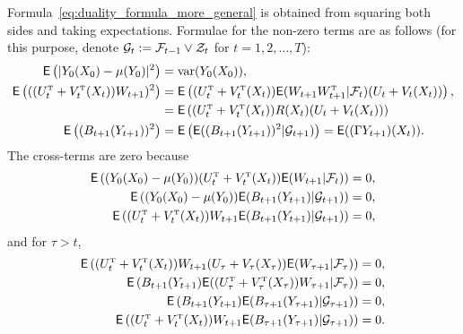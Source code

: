 \documentclass[twoside,11pt]{article}
\def\clZ{{\cal Z}}
\def\E{{\sf E}}
\def\clZ{{\cal Z}}
\def\E{{\sf E}}
\def\clZ{{\cal Z}}
\newcommand{\var}{\text{var}}
\def\clF{{\cal F}}
\def\clG{{\cal G}}
\def\clZ{{\cal Z}}
\def\E{{\sf E}}
\def\tp{{\hbox{\rm\tiny T}}}
\begin{document}
Formula~\eqref{eq:duality_formula_more_general} is
obtained from squaring both sides and taking expectations.  Formulae
for the non-zero terms are as follows (for this purpose, denote $\clG_{t}:=\clF_{t-1}\vee \clZ_{t}$ for $t=1,2,\hdots, T$):
\begin{align*}
  \E  \left(|Y_0(X_0) - \mu(Y_0)|^2 \right) & = \var(Y_0(X_0)), \\
  \E \left( ((U_t^\tp + V_t^\tp(X_t)) W_{t+1})^2 \right)& = \E \left( (U_t^\tp + V_t^\tp(X_t))
                                     \E(W_{t+1} W_{t+1}^\tp|\clF_t)
                                                          (U_t + V_t(X_t))\right), \\
                                 &=\E \left( (U_t^\tp + V_t^\tp(X_t))
                                     R(X_t)
                                                          (U_t + V_t(X_t))\right) \\
\E \left( (B_{t+1}(Y_{t+1}))^2 \right)  &= \E \left(
                                          \E((B_{t+1}(Y_{t+1}))^2
                                          |\clG_{t+1})\right) =
                                          \E((\Gamma Y_{t+1})(X_t)).
\end{align*}
The cross-terms are zero because
\begin{align*}
                                                                     \E
                                                                     \left((Y_0(X_0)
                                                                     -
                                                                     \mu(Y_0))
                                                                     (U_t^\tp
                                                                     +
                                                                     V_t^\tp(X_t))
                                                                     \E(W_{t+1}|\clF_t)
                                                                     \right)
                                                                     &=0, \\
     \E  \left((Y_0(X_0) - \mu(Y_0)) \E(B_{t+1}(Y_{t+1}) |\clG_{t+1}
     )\right) &= 0,\\
    \E \left((U_t^\tp+V_t^\tp (X_t)) W_{t+1} \E(B_{t+1}(Y_{t+1})
  |\clG_{t+1})\right) &=0,
\end{align*}
and for $\tau > t$,
\begin{align*}
 \E\left((U_t^\tp + V_t^\tp(X_t)) W_{t+1} (U_\tau + V_\tau(X_\tau)) \E(W_{\tau+1}
  |\clF_\tau)\right) &= 0 ,\\
  \E \left(B_{t+1}(Y_{t+1}) \E((U_\tau^\tp+V_\tau^\tp(X_\tau))
  W_{\tau+1}|\clF_{\tau})\right) &=0 ,
  \\
  \E \left( B_{t+1}(Y_{t+1})
  \E(B_{\tau+1}(Y_{\tau+1})|\clG_{\tau+1})\right) &= 0, \\
      \E \left((U_t^\tp+V_t^\tp(X_t)) W_{t+1} \E(B_{\tau+1}(Y_{\tau+1})
  |\clG_{\tau+1})\right) &=0.
\end{align*}
\end{document}
